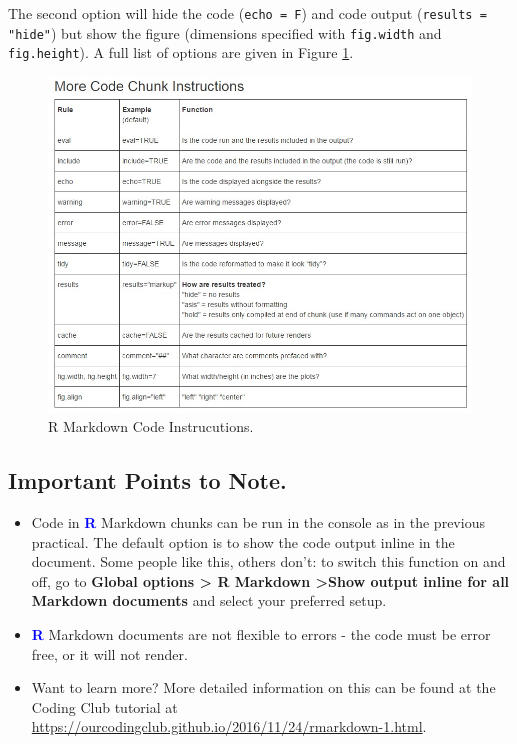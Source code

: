 \documentclass[a4paper,12pt]{article}
\newcommand\boldblue[1]{\textcolor{blue}{\textbf{#1}}}
\begin{document}
The second option will hide the code (\texttt{echo = F}) and code output (\texttt{results = "hide"}) but show the figure (dimensions specified with \texttt{fig.width} and \texttt{fig.height}). A full list of options are given in Figure \ref{fig:markdownrules}.

\begin{figure}[h]
\centering 
\includegraphics[width=1\textwidth]{figs/markdownrules.jpg}
\caption{R Markdown Code Instrucutions.}
\label{fig:markdownrules}
\end{figure} 


\subsection{Important Points to Note.}

\begin{itemize}

\item Code in \boldblue{R} Markdown chunks can be run in the console as in the previous practical. The default option is to show the code output inline in the document. Some people like this, others don't: to switch this function on and off, go to \textbf{Global options > R Markdown >Show output inline for all Markdown documents} and select your preferred setup.

\item \boldblue{R} Markdown documents are not flexible to errors - the code must be error free, or it will not render.

\item Want to learn more? More detailed information on this can be found at the Coding Club tutorial at \url{https://ourcodingclub.github.io/2016/11/24/rmarkdown-1.html}. \\

\end{itemize}
\end{document}

